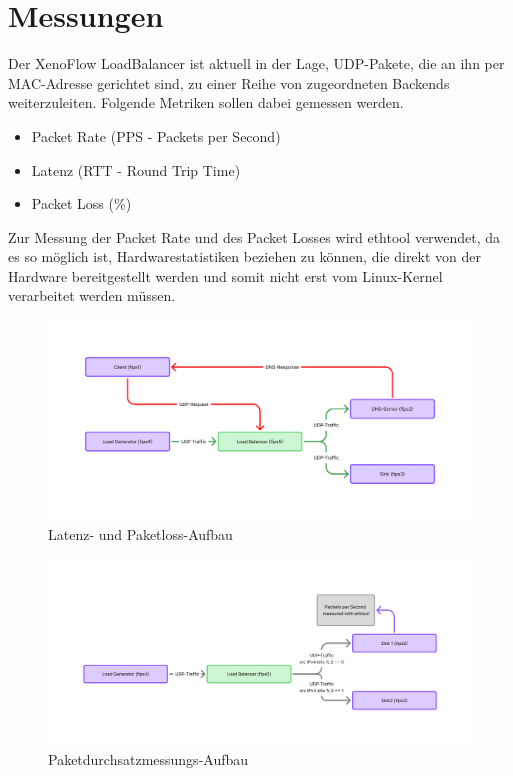 \section{Messungen}
Der XenoFlow LoadBalancer ist aktuell in der Lage, UDP-Pakete, die an ihn per MAC-Adresse gerichtet sind, zu einer Reihe von zugeordneten Backends weiterzuleiten. Folgende Metriken sollen dabei gemessen werden. 
\begin{itemize}
    \item Packet Rate (PPS - Packets per Second)
    \item Latenz (RTT - Round Trip Time)
    \item Packet Loss (\%)
\end{itemize}
Zur Messung der Packet Rate und des Packet Losses wird ethtool verwendet, da es so möglich ist, Hardwarestatistiken beziehen zu können, die direkt von der Hardware bereitgestellt werden und somit nicht erst vom Linux-Kernel verarbeitet werden müssen.
\begin{figure}
    \centering
    \includegraphics[width=1\linewidth]{images/Messaufbau Latenz.png}
    \caption{Latenz- und Paketloss-Aufbau}
    \label{fig:enter-label}
\end{figure}
\begin{figure}
    \centering
    \includegraphics[width=1\linewidth]{images/Messaufbau PPS.png}
    \caption{Paketdurchsatzmessungs-Aufbau}
    \label{fig:enter-label}
\end{figure}
